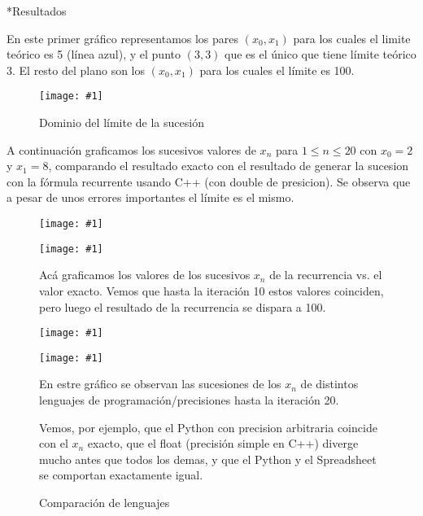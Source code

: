 \documentclass[12pt,titlepage]{article}
\newcommand{\gras}[2]{\noindent\texttt{[image: \#1]}\\}
\newenvironment{usection}[1]{\newpage\begin{section}*{#1}	\addcontentsline{toc}{section}{#1}}{\end{section}}
\begin{document}
	\begin{usection}{Resultados}

		En este primer gráfico representamos los pares $(x_0,x_1)$ para los cuales el limite teórico es 5 (línea azul),
		y el punto $(3,3)$ que es el único que tiene límite teórico 3.
		El resto del plano son los $(x_0,x_1)$ para los cuales el límite es 100.
		
		\begin{figure}[H]
			\centering
			\caption{Dominio del límite de la sucesión}
			\label{fig:dominio}
				\gras{lim5.png}{.6}
		\end{figure}
		
		\newpage
		A continuación graficamos los sucesivos valores de $x_n$ para $1\leq n\leq 20$ con $x_0=2$ y $x_1=8$, comparando el resultado exacto con el resultado de generar la sucesion con la fórmula recurrente usando C++ (con double de presicion).
		Se observa que a pesar de unos errores importantes el límite es el mismo.
		
		\begin{figure}[H]
			\centering
				\gras{fig_2_8_20.png}{.6}
		\end{figure}
		
		\begin{figure}[H]
			\centering
			\caption{Acá graficamos los valores de los sucesivos $x_n$ de la recurrencia vs. el valor exacto. Vemos que hasta la iteración 10 estos valores coinciden, pero luego el resultado de la recurrencia se dispara a 100.}
			\label{fig:comparaciones}
				\gras{fig_4_4-25_10.png}{.5}
		\end{figure}
		\begin{figure}[H]
			\centering
				\gras{fig_4_4-25_20.png}{.6}
		\end{figure}

		\noindent\begin{figure}[H]
			{\centering
			\caption{Comparación de lenguajes}
			\label{fig:comparaciones}
			\gras{fig_comparaciones.png}{.8}}
			En estre gráfico se observan las sucesiones de los $x_n$ de distintos lenguajes de programación/precisiones hasta la iteración 20.
			
			Vemos, por ejemplo, que el Python con precision arbitraria coincide con el $x_n$ exacto, que el float (precisión simple en C++) diverge mucho antes que todos los demas, y que el Python y el Spreadsheet se comportan exactamente igual.
			

\end{figure}
\end{usection}
\end{document}
